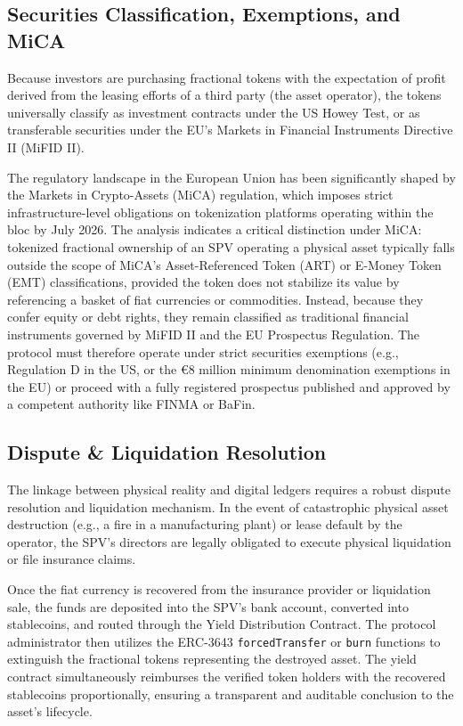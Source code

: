 \documentclass[12pt, a4paper]{article}
\begin{document}
\subsection{Securities Classification, Exemptions, and MiCA}
Because investors are purchasing fractional tokens with the expectation of profit derived from the leasing efforts of a third party (the asset operator), the tokens universally classify as investment contracts under the US Howey Test, or as transferable securities under the EU's Markets in Financial Instruments Directive II (MiFID II).

The regulatory landscape in the European Union has been significantly shaped by the Markets in Crypto-Assets (MiCA) regulation, which imposes strict infrastructure-level obligations on tokenization platforms operating within the bloc by July 2026. The analysis indicates a critical distinction under MiCA: tokenized fractional ownership of an SPV operating a physical asset typically falls outside the scope of MiCA's Asset-Referenced Token (ART) or E-Money Token (EMT) classifications, provided the token does not stabilize its value by referencing a basket of fiat currencies or commodities. Instead, because they confer equity or debt rights, they remain classified as traditional financial instruments governed by MiFID II and the EU Prospectus Regulation. The protocol must therefore operate under strict securities exemptions (e.g., Regulation D in the US, or the €8 million minimum denomination exemptions in the EU) or proceed with a fully registered prospectus published and approved by a competent authority like FINMA or BaFin.

\subsection{Dispute \& Liquidation Resolution}
The linkage between physical reality and digital ledgers requires a robust dispute resolution and liquidation mechanism. In the event of catastrophic physical asset destruction (e.g., a fire in a manufacturing plant) or lease default by the operator, the SPV's directors are legally obligated to execute physical liquidation or file insurance claims.

Once the fiat currency is recovered from the insurance provider or liquidation sale, the funds are deposited into the SPV's bank account, converted into stablecoins, and routed through the Yield Distribution Contract. The protocol administrator then utilizes the ERC-3643 \texttt{forcedTransfer} or \texttt{burn} functions to extinguish the fractional tokens representing the destroyed asset. The yield contract simultaneously reimburses the verified token holders with the recovered stablecoins proportionally, ensuring a transparent and auditable conclusion to the asset's lifecycle.
\end{document}
